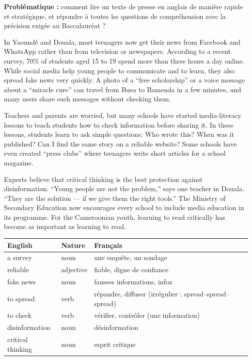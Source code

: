 \documentclass[11pt]{article}
\newcounter{popsec}
\newcounter{popsub}
\newcommand{\courssub}[1]{%
  \stepcounter{popsub}%
  \par\vspace{9pt}\noindent{\popxbold\fontsize{11.5}{13}\selectfont\color{popink}{\color{poporange}\thepopsec.\thepopsub}\hspace{6pt}#1}\par\nopagebreak\vspace{4pt}
}
\begin{document}
\textbf{Problématique :} comment lire un texte de presse en anglais de manière rapide et stratégique, et répondre à toutes les questions de compréhension avec la précision exigée au Baccalauréat ?

\courssub{Reading the text — first contact}

\begin{textebox}
In Yaoundé and Douala, most teenagers now get their news from Facebook and WhatsApp rather than from television or newspapers. According to a recent survey, 70\% of students aged 15 to 19 spend more than three hours a day online. While social media help young people to communicate and to learn, they also spread fake news very quickly. A photo of a “free scholarship” or a voice message about a “miracle cure” can travel from Buea to Bamenda in a few minutes, and many users share such messages without checking them.

Teachers and parents are worried, but many schools have started media-literacy lessons to teach students how to check information before sharing it. In these lessons, students learn to ask simple questions: Who wrote this? When was it published? Can I find the same story on a reliable website? Some schools have even created “press clubs” where teenagers write short articles for a school magazine.

Experts believe that critical thinking is the best protection against disinformation. “Young people are not the problem,” says one teacher in Douala. “They are the solution — if we give them the right tools.” The Ministry of Secondary Education now encourages every school to include media education in its programme. For the Cameroonian youth, learning to read critically has become as important as learning to read.
\end{textebox}

\begin{definition}
\begin{center}
\begin{tabularx}{\linewidth}{|l|l|X|}
\hline
\rowcolor{popblueL} \textbf{English} & \textbf{Nature} & \textbf{Français} \\
\hline
a survey & noun & une enquête, un sondage \\
\hline
reliable & adjective & fiable, digne de confiance \\
\hline
fake news & noun & fausses informations, infox \\
\hline
to spread & verb & répandre, diffuser (irrégulier : spread–spread–spread) \\
\hline
to check & verb & vérifier, contrôler (une information) \\
\hline
disinformation & noun & désinformation \\
\hline
critical thinking & noun & esprit critique \\
\hline
\end{tabularx}
\end{center}
\end{definition}
\end{document}
